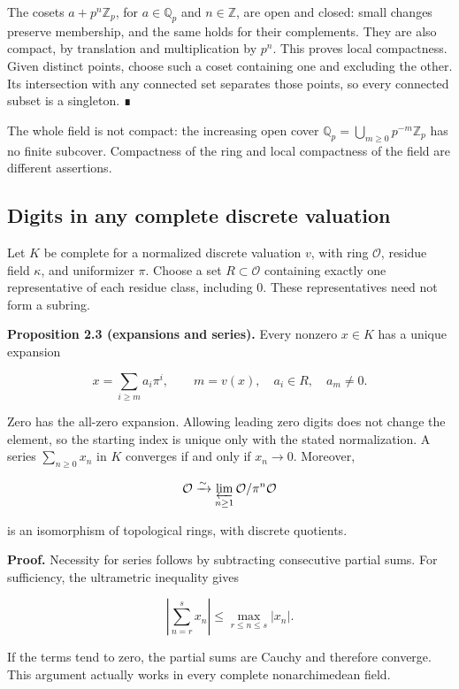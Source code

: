 \documentclass[
  english,
  11pt,
  a4paper,
]{article}
\begin{document}
The cosets \(a+p^n\mathbb Z_p\), for \(a\in\mathbb Q_p\) and
\(n\in\mathbb Z\), are open and closed: small changes preserve
membership, and the same holds for their complements. They are also
compact, by translation and multiplication by \(p^n\). This proves local
compactness. Given distinct points, choose such a coset containing one
and excluding the other. Its intersection with any connected set
separates those points, so every connected subset is a singleton. ∎

The whole field is not compact: the increasing open cover
\(\mathbb Q_p=\bigcup_{m\ge0}p^{-m}\mathbb Z_p\) has no finite subcover.
Compactness of the ring and local compactness of the field are different
assertions.

\subsection{Digits in any complete discrete
valuation}\label{NT-LOC-02--digits-in-any-complete-discrete-valuation}

Let \(K\) be complete for a normalized discrete valuation \(v\), with
ring \(\mathcal O\), residue field \(\kappa\), and uniformizer \(\pi\).
Choose a set \(R\subset\mathcal O\) containing exactly one
representative of each residue class, including \(0\). These
representatives need not form a subring.

\textbf{Proposition 2.3 (expansions and series).} Every nonzero
\(x\in K\) has a unique expansion

\[x=\sum_{i\ge m}a_i\pi^i,
\qquad m=v(x),\quad a_i\in R,\quad a_m\ne0.\]

Zero has the all-zero expansion. Allowing leading zero digits does not
change the element, so the starting index is unique only with the stated
normalization. A series \(\sum_{n\ge0}x_n\) in \(K\) converges if and
only if \(x_n\to0\). Moreover,

\[\mathcal O\xrightarrow{\sim}\varprojlim_{n\ge1}\mathcal O/\pi^n\mathcal O\]

is an isomorphism of topological rings, with discrete quotients.

\textbf{Proof.} Necessity for series follows by subtracting consecutive
partial sums. For sufficiency, the ultrametric inequality gives

\[\left|\sum_{n=r}^{s}x_n\right|\le\max_{r\le n\le s}|x_n|.\]

If the terms tend to zero, the partial sums are Cauchy and therefore
converge. This argument actually works in every complete nonarchimedean
field.
\end{document}

